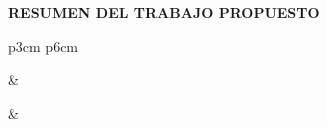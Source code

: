 \begin{center}
\begin{Large}
\textbf{RESUMEN DEL TRABAJO PROPUESTO}
\end{Large}
\end{center}


\begin{table}[h]
\centering
\begin{tabular}{p{3cm} p{6cm}}


                                                                                         &                                                                                                   \\[0.2cm]  \noalign{\smallskip}
                                                                                                                         
                                                                                     &                                                                                                            \\[0.2cm]  \noalign{\smallskip}
                                                        
                                                                                                                                                               


\end{tabular}
\end{table}
